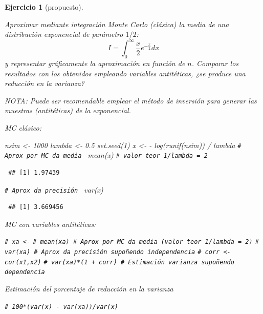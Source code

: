 \documentclass[
]{book}
\newenvironment{Shaded}{\begin{snugshade}}{\end{snugshade}}
\newcommand{\CommentTok}[1]{\textcolor[rgb]{0.56,0.35,0.01}{\textit{#1}}}
\newcommand{\DecValTok}[1]{\textcolor[rgb]{0.00,0.00,0.81}{#1}}
\newcommand{\FloatTok}[1]{\textcolor[rgb]{0.00,0.00,0.81}{#1}}
\newcommand{\FunctionTok}[1]{\textcolor[rgb]{0.00,0.00,0.00}{#1}}
\newcommand{\NormalTok}[1]{#1}
\newcommand{\OtherTok}[1]{\textcolor[rgb]{0.56,0.35,0.01}{#1}}
\newcommand{\SpecialCharTok}[1]{\textcolor[rgb]{0.00,0.00,0.00}{#1}}
\theoremstyle{break}
\newtheorem{exercise}{Ejercicio}[chapter]
\theoremstyle{nonumberplain}
\renewcommand{\CommentTok}[1]{\textcolor[rgb]{0.41,0.41,0.41}{\texttt{#1}}}
\begin{document}
\begin{exercise}[propuesto]
\protect\hypertarget{exr:int-ainv}{}\label{exr:int-ainv}

Aproximar mediante integración Monte Carlo (clásica) la media de una distribución exponencial de parámetro \(1/2\):
\[I=\int_{0}^{\infty}\frac{x}{2}e^{-\frac{x}{2}}dx\]
y representar gráficamente la aproximación en función de \(n\).
Comparar los resultados con los obtenidos empleando variables antitéticas,
¿se produce una reducción en la varianza?

NOTA: Puede ser recomendable emplear el método de inversión para generar las muestras (antitéticas) de la exponencial.

MC clásico:

\begin{Shaded}
\begin{Highlighting}[]
\NormalTok{nsim }\OtherTok{\textless{}{-}} \DecValTok{1000}
\NormalTok{lambda }\OtherTok{\textless{}{-}} \FloatTok{0.5}
\FunctionTok{set.seed}\NormalTok{(}\DecValTok{1}\NormalTok{)}
\NormalTok{x }\OtherTok{\textless{}{-}} \SpecialCharTok{{-}} \FunctionTok{log}\NormalTok{(}\FunctionTok{runif}\NormalTok{(nsim)) }\SpecialCharTok{/}\NormalTok{ lambda}
\CommentTok{\# Aprox por MC da media }
\FunctionTok{mean}\NormalTok{(x) }\CommentTok{\# valor teor 1/lambda = 2}
\end{Highlighting}
\end{Shaded}

\begin{verbatim}
 ## [1] 1.97439
\end{verbatim}

\begin{Shaded}
\begin{Highlighting}[]
\CommentTok{\# Aprox da precisión }
\FunctionTok{var}\NormalTok{(x)  }
\end{Highlighting}
\end{Shaded}

\begin{verbatim}
 ## [1] 3.669456
\end{verbatim}

MC con variables antitéticas:

\begin{Shaded}
\begin{Highlighting}[]
\CommentTok{\# xa \textless{}{-}}
\CommentTok{\# mean(xa) \# Aprox por MC da media (valor teor 1/lambda = 2)}
\CommentTok{\# var(xa)  \# Aprox da precisión supoñendo independencia}
\CommentTok{\# corr \textless{}{-} cor(x1,x2)}
\CommentTok{\# var(xa)*(1 + corr) \# Estimación varianza supoñendo dependencia}
\end{Highlighting}
\end{Shaded}

Estimación del porcentaje de reducción en la varianza

\begin{Shaded}
\begin{Highlighting}[]
\CommentTok{\# 100*(var(x) {-} var(xa))/var(x)}
\end{Highlighting}
\end{Shaded}

\end{exercise}
\end{document}
